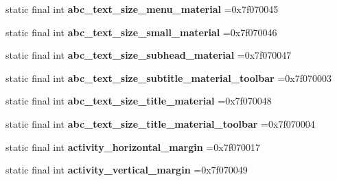 \begin{DoxyCompactItemize}
\item 
\hypertarget{classcheck_1_1test_1_1_r_1_1dimen_a35b186e7e2f2be9d08cd7eefc46415ea}{}static final int {\bfseries abc\+\_\+text\+\_\+size\+\_\+menu\+\_\+material} =0x7f070045\label{classcheck_1_1test_1_1_r_1_1dimen_a35b186e7e2f2be9d08cd7eefc46415ea}

\item 
\hypertarget{classcheck_1_1test_1_1_r_1_1dimen_aaab329a9ea863ed9c03d12717e17a1b2}{}static final int {\bfseries abc\+\_\+text\+\_\+size\+\_\+small\+\_\+material} =0x7f070046\label{classcheck_1_1test_1_1_r_1_1dimen_aaab329a9ea863ed9c03d12717e17a1b2}

\item 
\hypertarget{classcheck_1_1test_1_1_r_1_1dimen_af856197266ae23115d3d15aaa265ef35}{}static final int {\bfseries abc\+\_\+text\+\_\+size\+\_\+subhead\+\_\+material} =0x7f070047\label{classcheck_1_1test_1_1_r_1_1dimen_af856197266ae23115d3d15aaa265ef35}

\item 
\hypertarget{classcheck_1_1test_1_1_r_1_1dimen_a36740b9d792ce41821f83bd94a69eb4c}{}static final int {\bfseries abc\+\_\+text\+\_\+size\+\_\+subtitle\+\_\+material\+\_\+toolbar} =0x7f070003\label{classcheck_1_1test_1_1_r_1_1dimen_a36740b9d792ce41821f83bd94a69eb4c}

\item 
\hypertarget{classcheck_1_1test_1_1_r_1_1dimen_ae95c4a4d478e4ba6ec08caad40dec4ed}{}static final int {\bfseries abc\+\_\+text\+\_\+size\+\_\+title\+\_\+material} =0x7f070048\label{classcheck_1_1test_1_1_r_1_1dimen_ae95c4a4d478e4ba6ec08caad40dec4ed}

\item 
\hypertarget{classcheck_1_1test_1_1_r_1_1dimen_a0b1e43130b21669d3999e15b7c79773e}{}static final int {\bfseries abc\+\_\+text\+\_\+size\+\_\+title\+\_\+material\+\_\+toolbar} =0x7f070004\label{classcheck_1_1test_1_1_r_1_1dimen_a0b1e43130b21669d3999e15b7c79773e}

\item 
\hypertarget{classcheck_1_1test_1_1_r_1_1dimen_a6cd179b6378c059b2eb07c8f4a2ea4bd}{}static final int {\bfseries activity\+\_\+horizontal\+\_\+margin} =0x7f070017\label{classcheck_1_1test_1_1_r_1_1dimen_a6cd179b6378c059b2eb07c8f4a2ea4bd}

\item 
\hypertarget{classcheck_1_1test_1_1_r_1_1dimen_a815a5f88f61e98f4b2c315b80fe3ea2f}{}static final int {\bfseries activity\+\_\+vertical\+\_\+margin} =0x7f070049\label{classcheck_1_1test_1_1_r_1_1dimen_a815a5f88f61e98f4b2c315b80fe3ea2f}


\end{DoxyCompactItemize}
